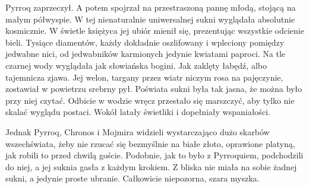 Pyrroq zaprzeczył. A potem spojrzał na przestraszoną pannę młodą, stojącą na małym półwyspie.
W tej nienaturalnie uniwersalnej sukni wyglądała absolutnie kosmicznie.
W świetle księżyca jej ubiór mienił się, prezentując wszystkie odcienie bieli.
Tysiące diamentów, każdy dokładnie oszlifowany i wpleciony pomiędzy jedwabne nici, od jedwabników karmionych jedynie kwiatami paproci.
Na tle czarnej wody wyglądała jak słowiańska bogini. Jak zaklęty łabędź, albo tajemnicza zjawa.
Jej welon, targany przez wiatr niczym rosa na pajęczynie, zostawiał w powietrzu srebrny pył.
Poświata sukni była tak jasna, że można było przy niej czytać.
Odbicie w wodzie wręcz przestało się marszczyć, aby tylko nie skalać wyglądu postaci.
Wokół latały świetliki i dopełniały wspaniałości.

Jednak Pyrroq, Chronos i Mojmira widzieli wystarczająco dużo skarbów wszechświata, żeby nie rzucać się bezmyślnie na białe złoto, oprawione platyną, 
jak robili to przed chwilą goście.
Podobnie, jak to było z Pyrroquiem, podchodzili do niej, a jej suknia gasła z każdym krokiem.
Z bliska nie miała na sobie żadnej sukni, a jedynie proste ubranie. Całkowicie niepozorna, szara myszka.

